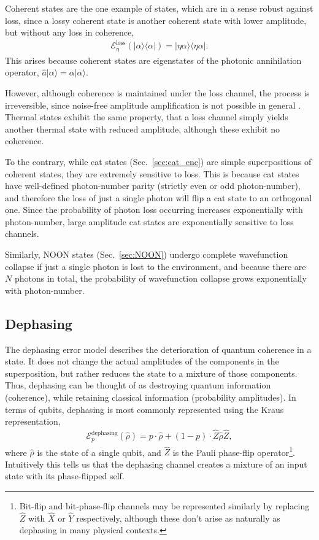 \documentclass[aps, rmp, twocolumn, amsmath, amssymb, nofootinbib, superscriptaddress, longbibliography, floatfix, table-of-contents, eqsecnum]{revtex4-1}
\newcommand{\bra}[1]{\langle#1|}
\newcommand{\ket}[1]{|#1\rangle}
\begin{document}
Coherent states are the one example of states, which are in a sense robust against loss, since a lossy coherent state is another coherent state with lower amplitude, but without any loss in coherence,
\begin{align}
\mathcal{E}^\text{loss}_\eta(\ket\alpha\bra\alpha) = \ket{\eta\alpha}\bra{\eta\alpha}.
\end{align}
This arises because coherent states are eigenstates of the photonic annihilation operator, \mbox{$\hat{a}\ket{\alpha}=\alpha\ket{\alpha}$}.

However, although coherence is maintained under the loss channel, the process is irreversible, since noise-free amplitude amplification is not possible in general \cite{???}. Thermal states exhibit the same property, that a loss channel simply yields another thermal state with reduced amplitude, although these exhibit no coherence.

To the contrary, while cat states (Sec.~\ref{sec:cat_enc}) are simple superpositions of coherent states, they are extremely sensitive to loss. This is because cat states have well-defined photon-number parity (strictly even or odd photon-number), and therefore the loss of just a single photon will flip a cat state to an orthogonal one. Since the probability of photon loss occurring increases exponentially with photon-number, large amplitude cat states are exponentially sensitive to loss channels.

Similarly, NOON states (Sec.~\ref{sec:NOON}) undergo complete wavefunction collapse if just a single photon is lost to the environment, and because there are $N$ photons in total, the probability of wavefunction collapse grows exponentially with photon-number.

%
%

\subsection{Dephasing} \label{sec:dephasing_error} 

The dephasing error model describes the deterioration of quantum coherence in a state. It does not change the actual amplitudes of the components in the superposition, but rather reduces the state to a mixture of those components. Thus, dephasing can be thought of as destroying quantum information (coherence), while retaining classical information (probability amplitudes). In terms of qubits, dephasing is most commonly represented using the Kraus representation,
\begin{align} \label{eq:dephasing_channel}
\mathcal{E}_p^\text{dephasing}(\hat\rho) = p\cdot\hat\rho + (1-p)\cdot \hat{Z}\hat\rho\hat{Z},
\end{align}
where $\hat\rho$ is the state of a single qubit, and $\hat{Z}$ is the Pauli phase-flip operator\footnote{Bit-flip and bit-phase-flip channels may be represented similarly by replacing $\hat{Z}$ with $\hat{X}$ or $\hat{Y}$ respectively, although these don't arise as naturally as dephasing in many physical contexts.}. Intuitively this tells us that the dephasing channel creates a mixture of an input state with its phase-flipped self.
\end{document}
